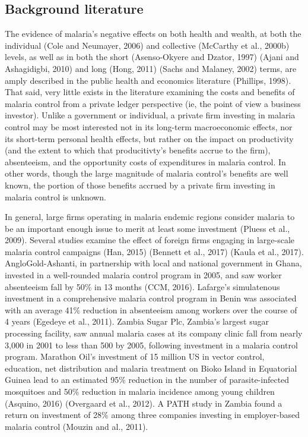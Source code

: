 \documentclass[]{article}
\begin{document}
\subsection{Background literature}\label{background-literature}

The evidence of malaria's negative effects on both health and wealth, at
both the individual (Cole and Neumayer, 2006) and collective (McCarthy
et al., 2000b) levels, as well as in both the short (Asenso-Okyere and
Dzator, 1997) (Ajani and Ashagidigbi, 2010) and long (Hong, 2011) (Sachs
and Malaney, 2002) terms, are amply described in the public health and
economics literature (Phillips, 1998). That said, very little exists in
the literature examining the costs and benefits of malaria control from
a private ledger perspective (ie, the point of view a business
investor). Unlike a government or individual, a private firm investing
in malaria control may be most interested not in its long-term
macroeconomic effects, nor its short-term personal health effects, but
rather on the impact on productivity (and the extent to which that
producitivty's benefits accrue to the firm), absenteeism, and the
opportunity costs of expenditures in malaria control. In other words,
though the large magnitude of malaria control's benefits are well known,
the portion of those benefits accrued by a private firm investing in
malaria control is unknown.

In general, large firms operating in malaria endemic regions consider
malaria to be an important enough issue to merit at least some
investment (Pluess et al., 2009). Several studies examine the effect of
foreign firms engaging in large-scale malaria control campaigns (Han,
2015) (Bennett et al., 2017) (Kaula et al., 2017). AngloGold-Ashanti, in
partnership with local and national government in Ghana, invested in a
well-rounded malaria control program in 2005, and saw worker absenteeism
fall by 50\% in 13 months (CCM, 2016). Lafarge's simulatenous investment
in a comprehensive malaria control program in Benin was associated with
an average 41\% reduction in absenteeism among workers over the course
of 4 years (Egedeye et al., 2011). Zambia Sugar Plc, Zambia's largest
sugar processing facility, saw annual malaria cases at its company
clinic fall from nearly 3,000 in 2001 to less than 500 by 2005,
following investment in a malaria control program. Marathon Oil's
investment of 15 million US in vector control, education, net
distribution and malaria treatment on Bioko Island in Equatorial Guinea
lead to an estimated 95\% reduction in the number of parasite-infected
mosquitoes and 50\% reduction in malaria incidence among young children
(Asquino, 2016) (Overgaard et al., 2012). A PATH study in Zambia found a
return on investment of 28\% among three companies investing in
employer-based malaria control (Mouzin and al., 2011).
\end{document}
